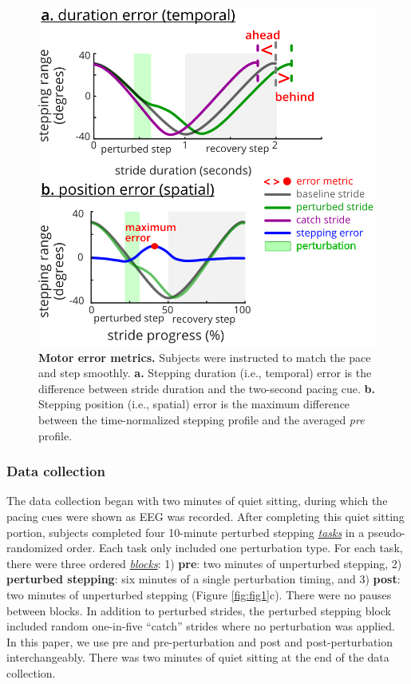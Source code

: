 \documentclass[../thesis_seyed.tex]{subfiles}
\begin{document}
\begin{figure}[!t]
\centerline{\includegraphics{../img/02_error_metrics.jpg}}
\caption{\textbf{Motor error metrics.} Subjects were instructed to match the pace and step smoothly. \textbf{a.} Stepping duration (i.e., temporal) error is the difference between stride duration and the two-second pacing cue. \textbf{b.} Stepping position (i.e., spatial) error is the maximum difference between the time-normalized stepping profile and the averaged \textit{pre} profile.}
\label{fig:fig2}
\end{figure}
\subsubsection{Data collection}
The data collection began with two minutes of quiet sitting, during which the  pacing cues were shown as EEG was recorded. After completing this quiet sitting portion, subjects completed four 10-minute perturbed stepping \textit{\underline{tasks}} in a pseudo-randomized order. Each task only included one perturbation type. For each task, there were three ordered \textit{\underline{blocks}}: 1) \textbf{pre}: two minutes of unperturbed stepping, 2)  \textbf{perturbed stepping}: six minutes of a single perturbation timing, and 3)  \textbf{post}: two minutes of unperturbed stepping (Figure \ref{fig:fig1}c). There were no pauses between blocks. In addition to perturbed strides, the perturbed stepping block included random one-in-five “catch” strides where no perturbation was applied. In this paper, we use pre and pre-perturbation and post and post-perturbation interchangeably. There was two minutes of quiet sitting at the end of the data collection.
\end{document}
